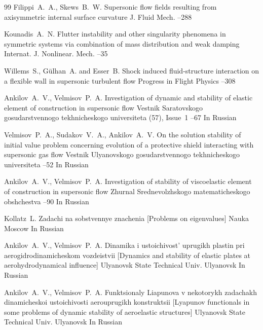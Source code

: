 \begin{thebibliography}{99}
\by Filippi~A.~A., Skews~B.~W.
\paper Supersonic flow fields resulting from axisymmetric internal surface curvature
\jour J. Fluid Mech.
--288

\by Kounadis~A.~N.
\paper Flutter instability and other singularity phenomena in symmetric systems via combination of mass distribution and weak damping
\jour  Internat. J. Nonlinear. Mech.
--35

\by Willems~S., G\"ulhan~A. and Esser~B. 
\paper Shock induced fluid-structure interaction on a flexible wall in supersonic turbulent flow
\jour Progress in Flight Physics
--308

\by Ankilov~A.~V., Velmisov~P.~A.
\paper Investigation of dynamic and stability of elastic element of construction in supersonic flow
\jour Vestnik Saratovskogo gosudarstvennogo tekhnicheskogo universiteta
(57), Issue~1
--67
\lang In Russian


\by Velmisov~P.~A., Sudakov~V.~A., Ankilov~A.~V.
\paper On the solution stability of initial value problem concerning evolution of a protective shield interacting with supersonic gas flow
\jour Vestnik Ulyanovskogo gosudarstvennogo tekhnicheskogo universiteta
--52
\lang In Russian

\by Ankilov~A.~V., Velmisov~P.~A.  
\paper Investigation of stability of viscoelastic element of construction in supersonic flow 
\jour Zhurnal Srednevolzhskogo matematicheskogo obshchestva
--90
\lang In Russian


\by Kollatz~L.
\book Zadachi na sobstvennye znachenia \rm [Problems on eigenvalues]
\publ Nauka
\publaddr Moscow
\lang In Russian

\by Ankilov~A.~V., Velmisov~P.~A.
\book Dinamika i ustoichivost' uprugikh plastin pri aerogidrodinamicheskom vozdeistvii \rm [Dynamics and stability of elastic plates at aerohydrodynamical influence]
\publ Ulyanovsk State Technical Univ.
\publaddr Ulyanovsk
\lang In Russian


\by Ankilov~A.~V., Velmisov~P.~A.
\book Funktsionaly Liapunova v nekotorykh zadachakh dinamicheskoi ustoichivosti aerouprugikh konstruktsii \rm [Lyapunov functionals in some problems of dynamic stability of aeroelastic structures]
\publ Ulyanovsk State Technical Univ.
\publaddr Ulyanovsk
\lang In Russian


\end{thebibliography}
